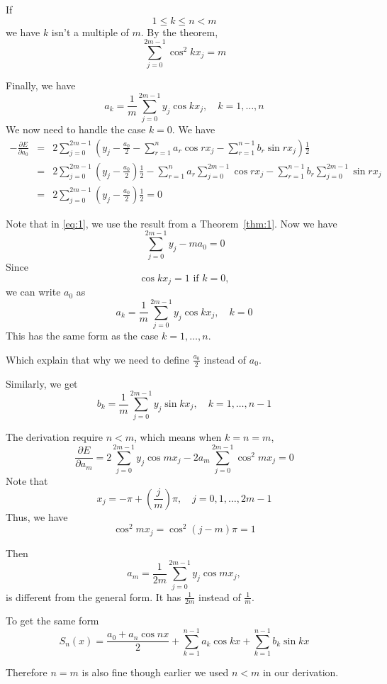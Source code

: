 \vspace{0.5em}

If \[
    1 \le k \le n < m
\]
we have $k$ isn't a multiple of $m$. By the theorem, \[
    \sum_{j=0}^{2m-1} \cos^2 k x_j = m
\]

Finally, we have \[
    a_k = \frac{1}{m} \sum_{j=0}^{2m-1} y_j \cos k x_j, \quad k = 1, \dots, n
\]
We now need to handle the case $k = 0$. We have 
\begin{eqnarray}
- \frac{\partial E}{\partial a_0}  &= & 
 2  \sum_{j=0}^{2m-1}
\left(y_j 
- 
\frac{a_0}{2}
- \sum_{r=1}^{n} a_r \cos rx_j - \sum_{r=1}^{n-1}
   b_r \sin rx_j \right) \frac{1}{2} \nonumber \\
&=&
2 \sum_{j=0}^{2m-1} \left(y_j - \frac{a_0}{2}\right) \frac{1}{2} 
- \sum_{r=1}^{n}
a_r \sum_{j=0}^{2m-1} \cos rx_j - \sum_{r=1}^{n-1} b_r \sum_{j=0}^{2m-1} \sin r x_j  \label{eq:1} \\
&= &2 \sum_{j=0}^{2m-1} \left(y_j - \frac{a_0}{2}\right) \frac{1}{2} = 0 \nonumber
\end{eqnarray}

Note that in \eqref{eq:1}, we use the result from a Theorem~\ref{thm:1}. Now we have \[
    \sum_{j=0}^{2m-1} y_j - m a_0 = 0
\]
Since \[
    \cos kx_j = 1 \mbox{ if } k=0,
\]
we can write $a_0$ as \[
    a_k = \frac{1}{m} \sum_{j=0}^{2m-1} y_j \cos k x_j, \quad k = 0
\]
This has the same form as the case $k = 1, \dots, n$. 

\begin{note}
    Which explain that why we need to define $\frac{a_0}{2}$ instead of $a_0$.
\end{note}

Similarly, we get \[
    b_k = \frac{1}{m} \sum_{j=0}^{2m-1} y_j \sin k x_j, \quad k = 1, \dots, n-1
\]

\begin{remark}
The derivation require $n < m$, which means when $k = n = m$, \[
    \frac{\partial E}{\partial a_m} = 2 \sum_{j=0}^{2m-1} y_j \cos m x_j - 2 a_m \sum_{j=0}^{2m-1} \cos^2 m x_j = 0
\]
Note that \[
    x_j = -\pi + \left(\frac{j}{m}\right) \pi, \quad j = 0, 1, \dots, 2m-1
\]
Thus, we have \[
    \cos^2 m x_j = \cos^2 (j-m) \pi = 1
\]

Then \[
    a_m = \frac{1}{2m} \sum_{j=0}^{2m-1} y_j \cos m x_j,
\]
is different from the general form. It has $\frac{1}{2m}$ instead of $\frac{1}{m}$. 

\vspace{1em}

To get the same form \[
    S_n(x) = \frac{a_0 + a_n \cos nx}{2} + \sum_{k=1}^{n-1} a_k \cos kx + \sum_{k=1}^{n-1} b_k \sin kx
\]

Therefore $n = m$ is also fine though earlier we used
$n < m$ in our derivation.
\end{remark}

